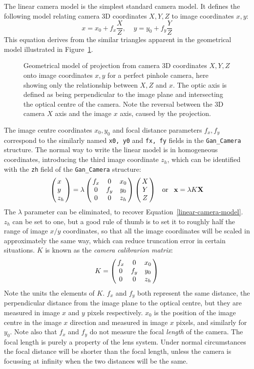 The linear camera model is the simplest standard camera model. It defines
the following model relating camera 3D coordinates $X,Y,Z$ to image
coordinates $x,y$:
\begin{equation}
 x = x_0 + f_x\frac{X}{Z},\;\;\;\;y = y_0 + f_y\frac{Y}{Z}
 \label{linear-camera-model}
\end{equation}
This equation derives from the similar triangles apparent in the
geometrical model illustrated in Figure~\ref{project}.
\begin{figure}
 \centerline{}
 \caption{Geometrical model of projection from camera 3D coordinates $X,Y,Z$
	onto image coordinates $x,y$ for a perfect pinhole camera,
	here showing only the relationship between $X,Z$ and $x$.
	The optic axis is defined as being perpendicular to the image plane
        and intersecting the optical centre of the camera. Note the reversal
	between the 3D camera $X$ axis and the image $x$ axis, caused by
        the projection.}
 \label{project}
\end{figure}
The image centre coordinates $x_0,y_0$ and focal distance parameters $f_x,f_y$
correspond to the similarly named {\tt x0, y0} and {\tt fx, fy} fields in
the {\tt Gan\_Camera} structure. The normal way to write the linear model
is in homogeneous coordinates, introducing the third image coordinate $z_h$,
which can be identified with the {\tt zh} field of the {\tt Gan\_Camera}
structure:
\[ \beginm{l} x \\ y \\ z_h \endm =
   \lambda \beginm{ccc} f_x & 0 & x_0 \\ 0 & f_y & y_0 \\ 0 & 0 & z_h \endm
   \beginm{c} X \\ Y \\ Z \endm\;\;\;\mbox{or}\;\;\;
   \xvec = \lambda K \Xvec
\]
The $\lambda$ parameter can be eliminated, to recover
Equation~\ref{linear-camera-model}.
$z_h$ can be set to one, but a good rule of thumb
is to set it to roughly half the range of image $x/y$ coordinates, so that
all the image coordinates will be scaled in approximately the same way,
which can reduce truncation error in certain situations.
$K$ is known as the {\em camera calibrarion matrix}:
\[ K = \beginm{ccc} f_x & 0 & x_0 \\ 0 & f_y & y_0 \\ 0 & 0 & z_h \endm
\]
Note the units the elements of $K$. $f_x$ and $f_y$ both represent the same
distance, the perpendicular distance from the image plane to the optical
centre, but they are measured in image $x$ and $y$ pixels respectively.
$x_0$ is the position of the image centre in the image $x$ direction and
measured in image $x$ pixels, and similarly for $y_0$. Note also that $f_x$
and $f_y$ do not measure the focal {\em length} of the camera.
The focal length is purely a property of the lens system.
Under normal circumstances the focal distance will be shorter than the
focal length, unless the camera
is focussing at infinity when the two distances will be the same.

